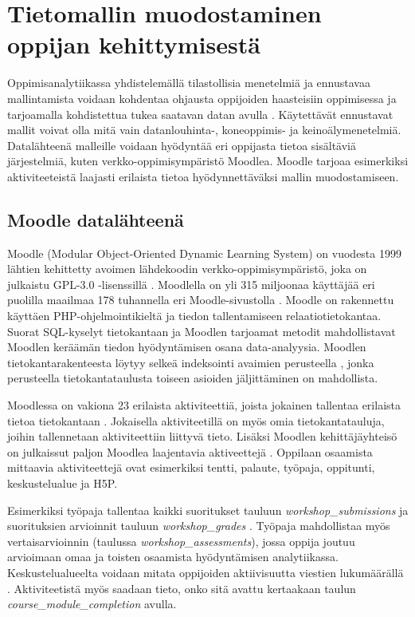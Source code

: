 \color{black}
\chapter{Tietomallin muodostaminen oppijan kehittymisestä\label{luku3}}

Oppimisanalytiikassa yhdistelemällä tilastollisia menetelmiä ja ennustavaa mallintamista voidaan kohdentaa ohjausta oppijoiden haasteisiin oppimisessa ja tarjoamalla kohdistettua tukea saatavan datan avulla \citep{ranjeethSurveyPredictiveModels2020}. Käytettävät ennustavat mallit voivat olla mitä vain datanlouhinta-, koneoppimis- ja keinoälymenetelmiä. Datalähteenä malleille voidaan hyödyntää eri oppijasta tietoa sisältäviä järjestelmiä, kuten verkko-oppimisympäristö Moodlea. Moodle tarjoaa esimerkiksi aktiviteeteistä laajasti erilaista tietoa hyödynnettäväksi mallin muodostamiseen.

\section{Moodle datalähteenä}

Moodle (Modular Object-Oriented Dynamic Learning System) on vuodesta 1999 lähtien kehittetty avoimen lähdekoodin verkko-oppimisympäristö, joka on julkaistu GPL-3.0 -lisenssillä \citep{dougiamasPowerOpenEducational2021,dougiamasMoodle2022}. Moodlella on yli 315 miljoonaa käyttäjää eri puolilla maailmaa 178 tuhannella eri Moodle-sivustolla \citep{moodle.orgMoodleStatistics}. Moodle on rakennettu käyttäen PHP-ohjelmointikieltä ja tiedon tallentamiseen relaatiotietokantaa. Suorat SQL-kyselyt tietokantaan ja Moodlen tarjoamat metodit mahdollistavat Moodlen keräämän tiedon hyödyntämisen osana data-analyysia. Moodlen tietokantarakenteesta löytyy selkeä indeksointi avaimien perusteella \citep{greenMoodle11Database2022}, jonka perusteella tietokantataulusta toiseen asioiden jäljittäminen on mahdollista.

Moodlessa on vakiona 23 erilaista aktiviteettiä, joista jokainen tallentaa erilaista tietoa tietokantaan \citep{dougiamasMoodle2022}. Jokaisella aktiviteetillä on myös omia tietokantatauluja, joihin tallennetaan aktiviteettiin liittyvä tieto. Lisäksi Moodlen kehittäjäyhteisö on julkaissut paljon Moodlea laajentavia aktiveettejä \citep{moodle.orgMoodlePluginsDirectory2022}. Oppilaan osaamista mittaavia aktiviteettejä ovat esimerkiksi tentti, palaute, työpaja, oppitunti, keskustelualue ja H5P.

Esimerkiksi työpaja tallentaa kaikki suoritukset tauluun \emph{workshop\_submissions} ja suorituksien arvioinnit tauluun \emph{workshop\_grades} \citep{greenMoodle11Database2022}. Työpaja mahdollistaa myös vertaisarvioinnin (taulussa \emph{workshop\_assessments}), jossa oppija joutuu arvioimaan omaa ja toisten osaamista hyödyntämisen analytiikassa. Keskustelualueelta voidaan mitata oppijoiden aktiivisuutta viestien lukumäärällä \citep{mwalumbweUsingLearningAnalytics2017}. Aktiviteetistä myös saadaan tieto, onko sitä avattu kertaakaan taulun \emph{course\_module\_completion} avulla.

